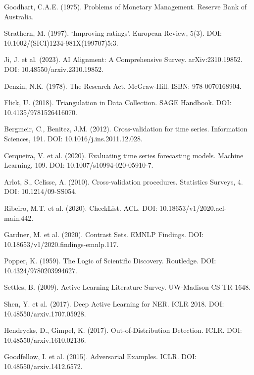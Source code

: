 \begin{enumerate}[label={[\arabic*]}]
\item Goodhart, C.A.E. (1975). Problems of Monetary Management. Reserve Bank
      of Australia.
\item Strathern, M. (1997). `Improving ratings'. European Review, 5(3).
      DOI: 10.1002/(SICI)1234-981X(199707)5:3.
\item Ji, J. et al. (2023). AI Alignment: A Comprehensive Survey.
      arXiv:2310.19852. DOI: 10.48550/arxiv.2310.19852.
\item Denzin, N.K. (1978). The Research Act. McGraw-Hill.
      ISBN: 978-0070168904.
\item Flick, U. (2018). Triangulation in Data Collection. SAGE Handbook.
      DOI: 10.4135/9781526416070.
\item Bergmeir, C., Benitez, J.M. (2012). Cross-validation for time series.
      Information Sciences, 191. DOI: 10.1016/j.ins.2011.12.028.
\item Cerqueira, V. et al. (2020). Evaluating time series forecasting models.
      Machine Learning, 109. DOI: 10.1007/s10994-020-05910-7.
\item Arlot, S., Celisse, A. (2010). Cross-validation procedures. Statistics
      Surveys, 4. DOI: 10.1214/09-SS054.
\item Ribeiro, M.T. et al. (2020). CheckList. ACL.
      DOI: 10.18653/v1/2020.acl-main.442.
\item Gardner, M. et al. (2020). Contrast Sets. EMNLP Findings.
      DOI: 10.18653/v1/2020.findings-emnlp.117.
\item Popper, K. (1959). The Logic of Scientific Discovery. Routledge.
      DOI: 10.4324/9780203994627.
\item Settles, B. (2009). Active Learning Literature Survey. UW-Madison
      CS TR 1648.
\item Shen, Y. et al. (2017). Deep Active Learning for NER. ICLR 2018.
      DOI: 10.48550/arxiv.1707.05928.
\item Hendrycks, D., Gimpel, K. (2017). Out-of-Distribution Detection.
      ICLR. DOI: 10.48550/arxiv.1610.02136.
\item Goodfellow, I. et al. (2015). Adversarial Examples. ICLR.
      DOI: 10.48550/arxiv.1412.6572.
\end{enumerate}
